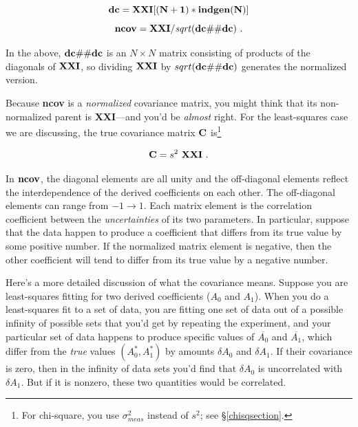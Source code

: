 \documentclass[psfig,preprint]{aastex}
\begin{document}
\begin{mathletters} \label{idlcovariance}
\begin{equation}
{\bf dc = XXI[(N+1)*indgen(N)]}
\end{equation}
\begin{equation}
{\bf ncov = XXI/{\it sqrt}(dc \# \#dc)} \ .
\end{equation}
\end{mathletters}

\noindent In the above, ${\bf dc \# \# dc}$ is an $N \times N$ matrix
consisting of products of the diagonals of ${\bf XXI}$, so dividing
${\bf XXI}$ by $sqrt({\bf dc \# \# dc})$ generates the normalized version. 

	Because {\bf ncov} is a {\it normalized} covariance matrix, you
might think that its non-normalized parent is {\bf XXI}---and you'd be
{\it almost} right.  For the least-squares case we are discussing, the
true covariance matrix ${\bf C}$ is\footnote{For chi-square, you use
$\sigma_{meas}^2$ instead of $s^2$; see \S \ref{chisqsection}.}

\begin{equation}
{\bf C} = s^2 \ {\bf XXI} \ .
\end{equation}

	In ${\bf ncov}$, the diagonal elements are all unity and the
off-diagonal elements reflect the interdependence of the derived
coefficients on each other.  The off-diagonal elements can range from
$-1 \rightarrow 1$. Each matrix element is the correlation coefficient
between the {\it uncertainties} of its two parameters. In particular,
suppose that the data happen to produce a coefficient that differs from
its true value by some positive number. If the normalized matrix element
is negative, then the other coefficient will tend to differ from its
true value by a negative number. 

	Here's a more detailed discussion of what the covariance means. 
Suppose you are least-squares fitting for two derived coefficients
($A_0$ and $A_1$).  When you do a least-squares fit to a set of data,
you are fitting one set of data out of a possible infinity of possible
sets that you'd get by repeating the experiment, and your particular set
of data happens to produce specific values of $\overline{ A_0}$ and $\overline{
A_1}$, which differ from the {\it true} values $(A_0^*, A_1^*)$ by
amounts $\delta A_0$ and $\delta A_1$.  If their covariance is zero,
then in the infinity of data sets you'd find that $\delta A_0$ is
uncorrelated with $\delta A_1$.  But if it is nonzero, these two
quantities would be correlated. 
\end{document}
